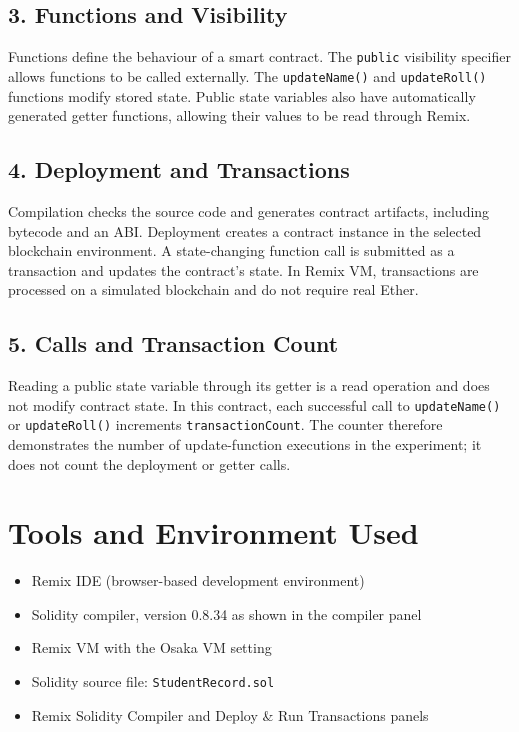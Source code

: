 \documentclass[12pt,a4paper]{article}
\begin{document}
\subsection{3. Functions and Visibility}
Functions define the behaviour of a smart contract. The \texttt{public} visibility specifier allows functions to be called externally. The \texttt{updateName()} and \texttt{updateRoll()} functions modify stored state. Public state variables also have automatically generated getter functions, allowing their values to be read through Remix.

\subsection{4. Deployment and Transactions}
Compilation checks the source code and generates contract artifacts, including bytecode and an ABI. Deployment creates a contract instance in the selected blockchain environment. A state-changing function call is submitted as a transaction and updates the contract's state. In Remix VM, transactions are processed on a simulated blockchain and do not require real Ether.

\subsection{5. Calls and Transaction Count}
Reading a public state variable through its getter is a read operation and does not modify contract state. In this contract, each successful call to \texttt{updateName()} or \texttt{updateRoll()} increments \texttt{transactionCount}. The counter therefore demonstrates the number of update-function executions in the experiment; it does not count the deployment or getter calls.

\section{Tools and Environment Used}
\begin{itemize}
    \item Remix IDE (browser-based development environment)
    \item Solidity compiler, version 0.8.34 as shown in the compiler panel
    \item Remix VM with the Osaka VM setting
    \item Solidity source file: \texttt{StudentRecord.sol}
    \item Remix Solidity Compiler and Deploy \& Run Transactions panels
\end{itemize}
\end{document}

